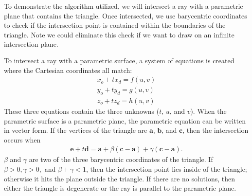 To demonstrate the algorithm utilized, we will intersect a ray with a parametric plane that contains the triangle.
Once intersected, we use barycentric coordinates to check if the intersection point is contained within the boundaries of the triangle. 
Note we could eliminate this check if we want to draw on an infinite intersection plane.

To intersect a ray with a parametric surface, a system of equations is created where the Cartesian coordinates all match:
\begin{align}
x_o + tx_d = f(u,v) \\
y_o + ty_d = g(u,v) \\
z_o + tz_d = h(u,v)
\end{align}
These three equations contain the three unknowns ($t$, $u$, and $v$).
When the parametric surface is a parametric plane, the parametric equation can be written in vector form.
If the vertices of the triangle are $\mathbf{a}$, $\mathbf{b}$, and $\mathbf{c}$, then the intersection occurs when
\begin{align}
\label{eq:raytreq}
\mathbf{e} + t\mathbf{d} = \mathbf{a} + \beta(\mathbf{c}-\mathbf{a}) + \gamma(\mathbf{c}-\mathbf{a}).
\end{align}
$\beta$ and $\gamma$ are two of the three barycentric coordinates of the triangle. 
If $\beta > 0, \gamma > 0,$ and $\beta + \gamma < 1$, then the intersection point lies inside of the triangle; otherwise it hits the plane outside the triangle.
If there are no solutions, then either the triangle is degenerate or the ray is parallel to the parametric plane.

